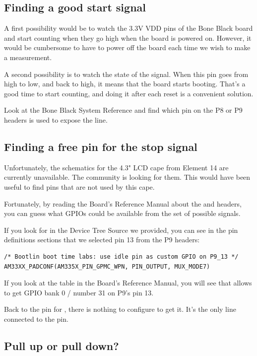 \subsection{Finding a good start signal}

A first possibility would be to watch the 3.3V VDD pins of the Bone
Black board and start counting when they go high when the board is
powered on. However, it would be cumbersome to have to power off the
board each time we wish to make a measurement.

A second possibility is to watch the state of the  signal.
When this pin goes from high to low, and back to high, it means that the
board starts booting. That's a good time to start counting, and doing
it after each reset is a convenient solution.

Look at the Bone Black System Reference and find which pin on the P8 or
P9 headers is used to expose the  line.

\subsection{Finding a free pin for the stop signal}

Unfortunately, the schematics for the 4.3" LCD cape from Element 14
are currently unavailable. The community is looking for them.
This would have been useful to find pins that are not used by
this cape.

Fortunately, by reading the Board's Reference Manual about the
 and  headers, you can guess what GPIOs could be
available from the set of possible signals.

If you look for  in the Device Tree Source we provided,
you can see in the pin definitions sections that we selected pin 13 from
the P9 headers:

\begin{verbatim}
/* Bootlin boot time labs: use idle pin as custom GPIO on P9_13 */
AM33XX_PADCONF(AM335X_PIN_GPMC_WPN, PIN_OUTPUT, MUX_MODE7)
\end{verbatim}

If you look at the  table in the
Board's Reference Manual, you will see that  allows to get
GPIO bank 0 / number 31 on P9's pin 13.

Back to the pin for , there is nothing to configure to
get it. It's the only line connected to the pin.

\subsection{Pull up or pull down?}

